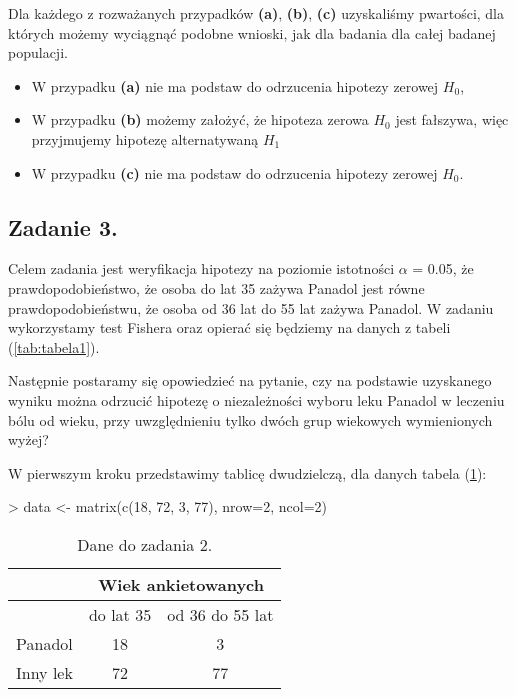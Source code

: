\documentclass[12pt]{mwart}
\begin{document}
Dla każdego z rozważanych przypadków \pauza \textbf{(a)}, \textbf{(b)}, \textbf{(c)} uzyskaliśmy p{\ppauza}wartości, dla których możemy wyciągnąć podobne wnioski, jak dla badania dla całej badanej populacji.

\begin{itemize}[label=$\bullet$]
\item W przypadku \textbf{(a)} nie ma podstaw do odrzucenia hipotezy zerowej $H_0$,
\item W przypadku \textbf{(b)} możemy założyć, że hipoteza zerowa $H_0$ jest fałszywa, więc przyjmujemy hipotezę alternatywaną $H_1$
\item W przypadku \textbf{(c)} nie ma podstaw do odrzucenia hipotezy zerowej $H_0$.
\end{itemize}

\subsection{Zadanie 3.}

Celem zadania jest weryfikacja hipotezy na poziomie istotności $\alpha$ = 0.05, że prawdopodobieństwo, że osoba do lat 35 zażywa Panadol jest równe prawdopodobieństwu, że osoba od 36 lat do 55 lat
zażywa Panadol. W zadaniu wykorzystamy test Fishera oraz opierać się będziemy na danych z tabeli (\ref{tab:tabela1}). 

Następnie postaramy się opowiedzieć na pytanie, czy na podstawie uzyskanego wyniku można odrzucić hipotezę o niezależności wyboru leku Panadol w leczeniu bólu od wieku, przy uwzględnieniu tylko dwóch grup wiekowych wymienionych wyżej?

W pierwszym kroku przedstawimy tablicę dwudzielczą, dla danych \pauza tabela (\ref{tab:tabela3}):

\begin{Schunk}
\begin{Sinput}
> data <- matrix(c(18, 72, 3, 77), nrow=2, ncol=2)
\end{Sinput}
\end{Schunk}

\begin{table}[h!]
	\begin{center}
		\begin{tabular}{|c|c|c|}
			\hline
			& \multicolumn{2}{|c|}{Wiek ankietowanych}\\\hline
			& do lat 35 & od 36 do 55 lat \\\hline
			Panadol & 18 & 3 \\\hline
			Inny lek & 72 & 77\\\hline
		\end{tabular}
	\end{center}
	\caption{Dane do zadania 2.}
	\label{tab:tabela3}
\end{table}
\end{document}
